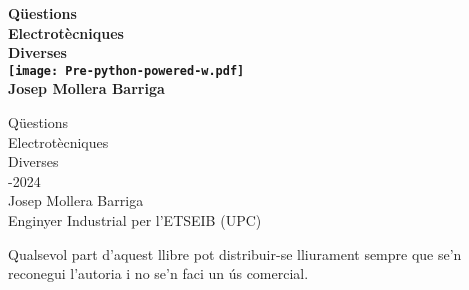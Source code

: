
\BgThispage
      
\begin{titlepage}
	\parbox{18cm}{\fontsize{60pt}{60pt}\sffamily\bfseries\selectfont\color{red}%
		Qüestions\\[25pt] Electrotècniques\\[25pt] Diverses\\
		\hspace*{9.5cm}\texttt{[image: Pre-python-powered-w.pdf]}\\
		\fontsize{30pt}{30pt}\sffamily\mdseries\selectfont{}Josep Mollera Barriga}
	\vspace*{10mm}
	\begin{center}
		\fontsize{10pt}{11pt}\normalfont\selectfont
		
	\end{center}
\end{titlepage}

\cleardoublepage\thispagestyle{empty}
{\fontsize{60pt}{60pt}\selectfont%
	Qüestions\\[25pt]
	Electrotècniques\\[25pt]
	Diverses\\[90pt]}
{\fontsize{40pt}{40pt}-2024 \hspace{5mm}{\Huge(versió 14.7)}\\[85pt]
	Josep Mollera Barriga\\[25pt]}
{\fontsize{25pt}{25pt}\selectfont
	Enginyer Industrial per l'ETSEIB (UPC)}
\vfill
{\fontsize{15pt}{20pt}\selectfont
	\begin{list}{}
		{\setlength{\labelwidth}{7mm} \setlength{\leftmargin}{7mm}\setlength{\labelsep}{2mm}}
		\item[{\faCopyright[regular]}]  Qualsevol part d'aquest llibre  pot  distribuir-se lliurament
		sempre que se’n reconegui l’autoria i no se’n faci un ús comercial.
\end{list}}

